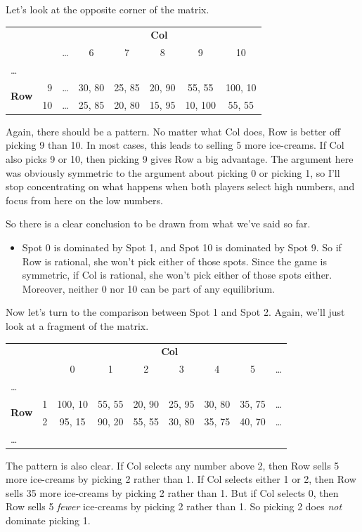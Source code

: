 \documentclass[openany]{book}
\begin{document}
Let's look at the opposite corner of the matrix.

\begin{center}
\begin{tabular}{l r | c c c c c c}
& & \multicolumn{6}{c}{\textbf{Col}} \\
& & \dots & 6 & 7 & 8 & 9 & 10  \\ \hline
\dots \\
\multirow{2}{*}{\textbf{Row}} & 9 & \dots & 30, 80 & 25, 85 & 20, 90 & 55, 55 & 100, 10 \\
& 10 & \dots & 25, 85 & 20, 80 & 15, 95 & 10, 100 & 55, 55 \\
\end{tabular}
\end{center}
Again, there should be a pattern. No matter what Col does, Row is better off picking 9 than 10. In most cases, this leads to selling 5 more ice-creams. If Col also picks 9 or 10, then picking 9 gives Row a big advantage. The argument here was obviously symmetric to the argument about picking 0 or picking 1, so I'll stop concentrating on what happens when both players select high numbers, and focus from here on the low numbers.

So there is a clear conclusion to be drawn from what we've said so far.

\begin{itemize}
\item Spot 0 is dominated by Spot 1, and Spot 10 is dominated by Spot 9. So if Row is rational, she won't pick either of those spots. Since the game is symmetric, if Col is rational, she won't pick either of those spots either. Moreover, neither 0 nor 10 can be part of any equilibrium.
\end{itemize}

\noindent Now let's turn to the comparison between Spot 1 and Spot 2. Again, we'll just look at a fragment of the matrix.

\begin{center}
\begin{tabular}{l r | c c c c c c c}
& & \multicolumn{7}{c}{\textbf{Col}} \\
& & 0 & 1 & 2 & 3 & 4 & 5 & \dots  \\ \hline
\dots \\
\multirow{2}{*}{\textbf{Row}} & 1 & 100, 10 & 55, 55 & 20, 90 & 25, 95 & 30, 80 & 35, 75 & \dots \\
& 2 & 95, 15 & 90, 20 & 55, 55 & 30, 80 & 35, 75 & 40, 70 &  \dots \\
\dots 
\end{tabular}
\end{center}
The pattern is also clear. If Col selects any number above 2, then Row sells 5 more ice-creams by picking 2 rather than 1. If Col selects either 1 or 2, then Row sells 35 more ice-creams by picking 2 rather than 1. But if Col selects 0, then Row sells 5 \textit{fewer} ice-creams by picking 2 rather than 1. So picking 2 does \textit{not} dominate picking 1.
\end{document}
